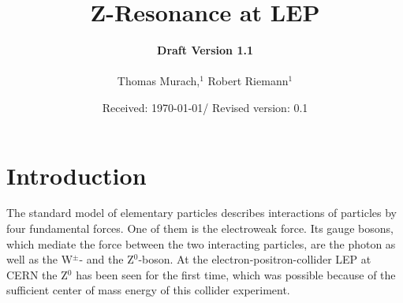 \documentclass[epj,nopacs]{svjour}
\begin{document}
\hugehead

\newcommand{\dd}[1]{\mathrm{d}#1\,} %
\newcommand{\lref}[1]{listing~(\ref{lst:#1})} %
\newcommand{\fref}[1]{fig.~(\ref{fig:#1})} %
\newcommand{\tref}[1]{tab.~(\ref{tab:#1})} %
\newcommand{\eref}[1]{eq.~(\ref{eqn:#1})} %

\title{Z-Resonance at LEP}
\author{{\bf Draft Version 1.1}\\
\medskip \\
Thomas Murach,$^{1}$
Robert Riemann$^{1}$
} 
\date{Received: \today / Revised version: 0.1}
\maketitle

\vspace*{-1.5cm}
\section{ Introduction}
\baselineskip=0.38cm
\vspace*{1.cm}

The standard model of elementary particles describes interactions of particles
by four fundamental forces. One of them is the electroweak force. Its gauge
bosons, which mediate the force between the two interacting particles, are the
photon as well as the W$^{\pm}$- and the Z$^0$-boson. At the
electron-positron-collider LEP at CERN the Z$^0$ has been seen for the first
time, which was possible because of the sufficient center of mass energy of this
collider experiment.
\end{document}

